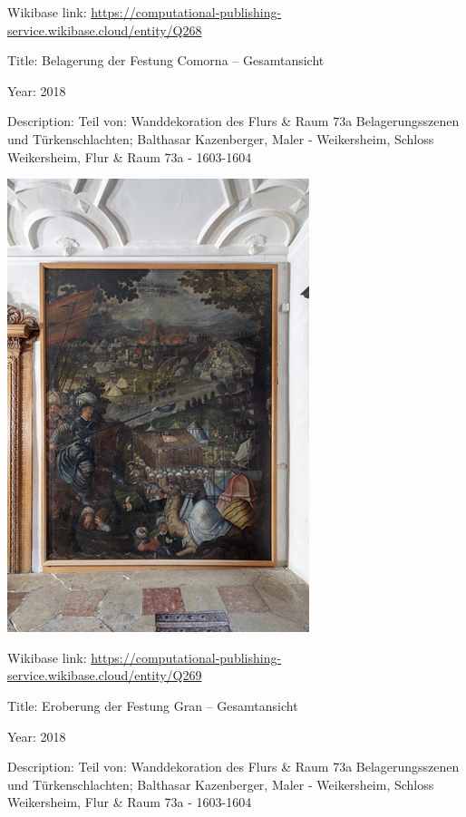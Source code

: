 \documentclass[
  letterpaper,
]{book}
\begin{document}
Wikibase link:
\url{https://computational-publishing-service.wikibase.cloud/entity/Q268}

Title: Belagerung der Festung Comorna -- Gesamtansicht

Year: 2018

Description: Teil von: Wanddekoration des Flurs \& Raum 73a
Belagerungsszenen und Türkenschlachten; Balthasar Kazenberger, Maler -
Weikersheim, Schloss Weikersheim, Flur \& Raum 73a - 1603-1604

\includegraphics{paintings_files/figure-pdf/cell-3-output-28.png}

Wikibase link:
\url{https://computational-publishing-service.wikibase.cloud/entity/Q269}

Title: Eroberung der Festung Gran -- Gesamtansicht

Year: 2018

Description: Teil von: Wanddekoration des Flurs \& Raum 73a
Belagerungsszenen und Türkenschlachten; Balthasar Kazenberger, Maler -
Weikersheim, Schloss Weikersheim, Flur \& Raum 73a - 1603-1604
\end{document}
